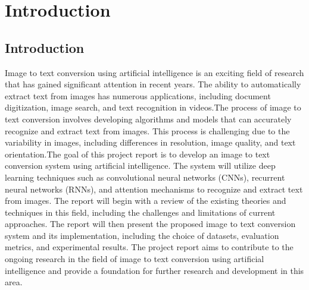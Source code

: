
\section{Introduction}
\subsection{Introduction}
Image to text conversion using artificial intelligence is an exciting field of research that has gained significant attention in recent years. The ability to automatically extract text from images has numerous applications, including document digitization, image search, and text recognition in videos.The process of image to text conversion involves developing algorithms and models that can accurately recognize and extract text from images. This process is challenging due to the variability in images, including differences in resolution, image quality, and text orientation.The goal of this project report is to develop an image to text conversion system using artificial intelligence. The system will utilize deep learning techniques such as convolutional neural networks (CNNs), recurrent neural networks (RNNs), and attention mechanisms to recognize and extract text from images.
The report will begin with a review of the existing theories and techniques in this field, including the challenges and limitations of current approaches. The report will then present the proposed image to text conversion system and its implementation, including the choice of datasets, evaluation metrics, and experimental results. The project report aims to contribute to the ongoing research in the field of image to text conversion using artificial intelligence and provide a foundation for further research and development in this area.


